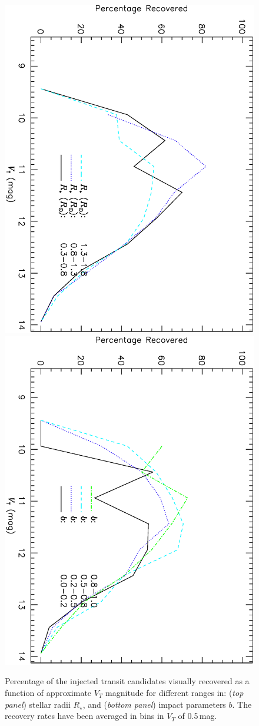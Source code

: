 \begin{figure}
\begin{center}
\centering
\includegraphics[width=.55\textwidth, angle=90]{7_visual_h}\\
\includegraphics[width=.55\textwidth, angle=90]{7_visual_i}\\
\caption[Visual recovery of different stellar radii and impact parameters]{%
Percentage of the injected transit candidates visually recovered as a function of approximate $V_{T}$ magnitude for different ranges in: %
({\it top panel}) stellar radii $R_{\star}$, and %
({\it bottom panel}) impact parameters $b$. %
The recovery rates have been averaged in bins in $V_{T}$ of 0.5\,mag.%
}
\label{cha:human:sec:model:fig:visrecrates2}
\end{center}
\end{figure}

